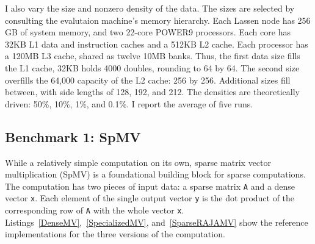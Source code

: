 

I also vary the size and nonzero density of the data.
The sizes are selected by consulting the evalutaion machine's memory hierarchy.
Each Lassen node has 256 GB of system memory, and two 22-core POWER9 processors.
Each core has 32KB L1 data and instruction caches and a 512KB L2 cache.
Each processor has a 120MB L3 cache, shared as twelve 10MB banks.
Thus, the first data size fills the L1 cache, 32KB holds 4000 doubles, rounding to 64 by 64. 
The second size overfills the 64,000 capacity of the L2 cache: 256 by 256.
Additional sizes fill between, with side lengths of 128, 192, and 212.
The densities are theoretically driven: 50\%, 10\%, 1\%, and 0.1\%. 
I report the average of five runs.



\subsection{Benchmark 1: SpMV}
While a relatively simple computation on its own, sparse matrix vector multiplication (SpMV) is a foundational building block for sparse computations.
The computation has two pieces of input data: a sparse matrix \verb.A. and a dense vector \verb.x.. 
Each element of the single output vector \verb.y. is the dot product of the corresponding row of \verb.A. with the whole vector \verb.x..
Listings~\ref{DenseMV},~\ref{SpecializedMV}, and~\ref{SparseRAJAMV} show the reference implementations for the three versions of the computation.


